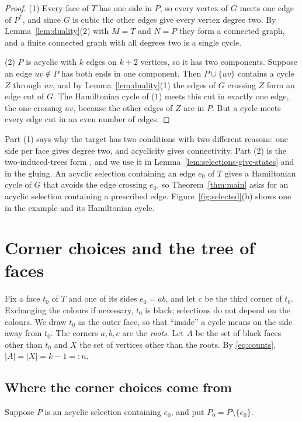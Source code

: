 \documentclass[10pt]{amsart}
\numberwithin{equation}{section}
\theoremstyle{definition}
\theoremstyle{remark}
\newcommand{\T}{T}
\begin{document}
\begin{proof}
(1) Every face of $\T$ has one side in $P$, so every vertex of $G$ meets one edge of $P^*$, and since $G$ is cubic the other edges give every vertex degree two.
By Lemma~\ref{lem:duality}(2) with $M=\T$ and $N=P$ they form a connected graph, and a finite connected graph with all degrees two is a single cycle.

(2) $P$ is acyclic with $k$ edges on $k+2$ vertices, so it has two components.
Suppose an edge $uv\notin P$ has both ends in one component.
Then $P\cup\{uv\}$ contains a cycle $Z$ through $uv$, and by Lemma~\ref{lem:duality}(1) the edges of $G$ crossing $Z$ form an edge cut of $G$.
The Hamiltonian cycle of (1) meets this cut in exactly one edge, the one crossing $uv$, because the other edges of $Z$ are in $P$.
But a cycle meets every edge cut in an even number of edges.
\end{proof}

Part (1) says why the target has two conditions with two different reasons: one side per face gives degree two, and acyclicity gives connectivity.
Part (2) is the two-induced-trees form \cite{stein1971,apsw2016}, and we use it in Lemma~\ref{lem:selections-give-states} and in the gluing.
An acyclic selection containing an edge $e_0$ of $\T$ gives a Hamiltonian cycle of $G$ that avoids the edge crossing $e_0$, so Theorem~\ref{thm:main} asks for an acyclic selection containing a prescribed edge.
Figure~\ref{fig:selected}(b) shows one in the example and its Hamiltonian cycle.

\section{Corner choices and the tree of faces}\label{sec:corners}

Fix a face $t_0$ of $\T$ and one of its sides $e_0=ab$, and let $c$ be the third corner of $t_0$.
Exchanging the colours if necessary, $t_0$ is black; selections do not depend on the colours.
We draw $t_0$ as the outer face, so that ``inside'' a cycle means on the side away from $t_0$.
The corners $a,b,c$ are the \emph{roots}.
Let $A$ be the set of black faces other than $t_0$ and $X$ the set of vertices other than the roots.
By \eqref{eq:counts}, $|A|=|X|=k-1=:n$.

\subsection*{Where the corner choices come from}
Suppose $P$ is an acyclic selection containing $e_0$, and put $P_0=P\setminus\{e_0\}$.
\end{document}
